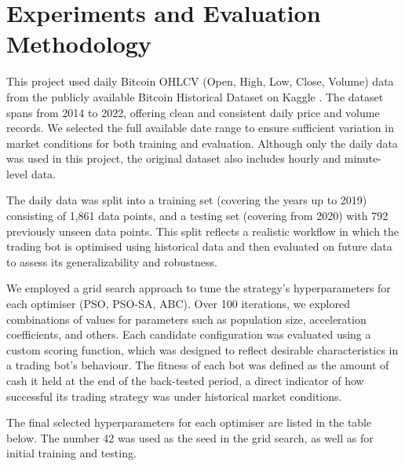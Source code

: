 \documentclass[a4paper, 12pt]{extarticle}
\begin{document}
\section{Experiments and Evaluation Methodology}

This project used daily Bitcoin OHLCV (Open, High, Low, Close, Volume) data from the publicly available Bitcoin Historical Dataset on Kaggle \cite{kaggle}. The dataset spans from 2014 to 2022, offering clean and consistent daily price and volume records. We selected the full available date range to ensure sufficient variation in market conditions for both training and evaluation. Although only the daily data was used in this project, the original dataset \cite{kaggle} also includes hourly and minute-level data. 

The daily data was split into a training set (covering the years up to 2019) consisting of 1,861 data points, and a testing set (covering from 2020) with 792 previously unseen data points. This split reflects a realistic workflow in which the trading bot is optimised using historical data and then evaluated on future data to assess its generalizability and robustness. 

We employed a grid search approach to tune the strategy's hyperparameters for each optimiser (PSO, PSO-SA, ABC). Over 100 iterations, we explored combinations of values for parameters such as population size, acceleration coefficients, and others. Each candidate configuration was evaluated using a custom scoring function, which was designed to reflect desirable characteristics in a trading bot's behaviour.
The fitness of each bot was defined as the amount of cash it held at the end of the back-tested period, a direct indicator of how successful its trading strategy was under historical market conditions.

The final selected hyperparameters for each optimiser are listed in the table below. The number 42 was used as the seed in the grid search, as well as for initial training and testing.  
\end{document}
